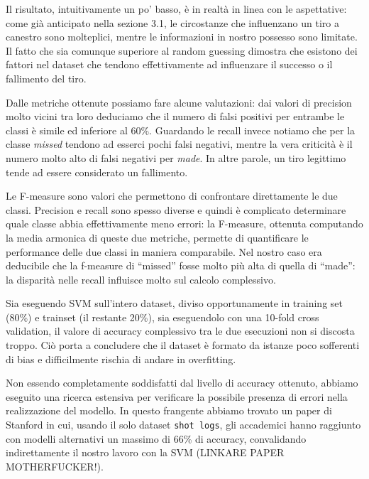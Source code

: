 \par
Il risultato, intuitivamente un po’ basso, è in realtà in linea con le aspettative: come già anticipato nella sezione 3.1, le circostanze che influenzano un tiro a canestro sono molteplici, mentre le informazioni in nostro possesso sono limitate. Il fatto che sia comunque  superiore al random guessing dimostra che esistono dei fattori nel dataset che tendono effettivamente ad influenzare il successo o il fallimento del tiro.

\par
Dalle metriche ottenute possiamo fare alcune valutazioni: dai valori di precision molto vicini tra loro deduciamo che il numero di falsi positivi per entrambe le classi è simile ed inferiore al 60\%.
Guardando le recall invece notiamo che per la classe \textit{missed} tendono ad esserci pochi falsi negativi, mentre la vera criticità è il numero molto alto di falsi negativi per \textit{made}. In altre parole, un tiro legittimo tende ad essere considerato un fallimento.

Le F-measure sono valori che permettono di confrontare direttamente le due classi. Precision e recall sono spesso diverse e quindi è complicato determinare quale classe abbia effettivamente meno errori: la F-measure, ottenuta computando la media armonica di queste due metriche, permette di quantificare le performance delle due classi in maniera comparabile. Nel nostro caso era deducibile che la f-measure di “missed” fosse molto più alta di quella di “made”: la disparità nelle recall influisce molto sul calcolo complessivo.

\par
Sia eseguendo SVM sull'intero dataset, diviso opportunamente in training set (80\%) e trainset (il restante 20\%), sia eseguendolo con una 10-fold cross validation, il valore di accuracy complessivo tra le due esecuzioni non si discosta troppo. Ciò porta a concludere che il dataset è formato da istanze poco sofferenti di bias e difficilmente rischia di andare in overfitting.

\par
Non essendo completamente soddisfatti dal livello di accuracy ottenuto, abbiamo eseguito una ricerca estensiva per verificare la possibile presenza di errori nella realizzazione del modello. In questo frangente abbiamo trovato un paper di Stanford in cui, usando il solo dataset \texttt{shot logs}, gli accademici hanno raggiunto con modelli alternativi un massimo di 66\% di accuracy, convalidando indirettamente il nostro lavoro con la SVM (LINKARE PAPER MOTHERFUCKER!).
